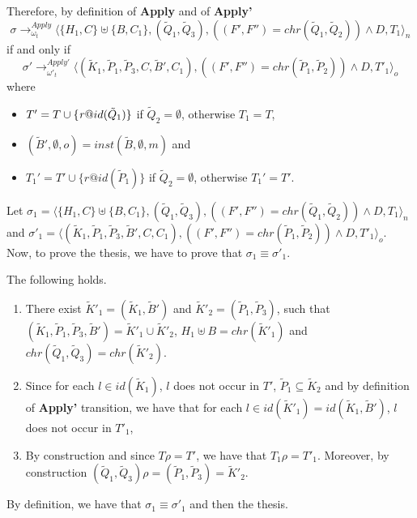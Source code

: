 \documentclass[final]{acmtrans2e}
\newcommand{\la}{\langle}
\newcommand{\ra}{\rangle}
\newcommand{\rrarrow}{\longrightarrow}
\begin{document}
\begin{description}
Therefore, by definition of {\bf Apply} and of {\bf Apply'}
\[\sigma \rrarrow^{Apply}_{\omega_t} \la \{H_1,C\}\uplus \{B, C_1 \},(\tilde Q_1, \tilde Q_3),
((F',  F'')=chr(\tilde Q_1, \tilde Q_2))\wedge D, T_1 \ra_n\]
if and only if
\[\sigma' \rightarrow^{Apply'}_{\omega'_t}  \la(\tilde K_1,\tilde P_1, \tilde P_3 ,C, \tilde B', C_1),
((F',  F'')=chr(\tilde P_1, \tilde P_2))\wedge D, T'_1 \ra_o\]
where
\begin{itemize}
  \item $T'=T \cup \{{\it r}@id (\tilde Q_1)\}$ if $\tilde Q_2=\emptyset$,
 otherwise $T_1=T$,
  \item $(\tilde B',\emptyset ,o )= inst(\tilde B,\emptyset ,m)$ and
  \item $T_1'=T'\cup \{r @id (\tilde P_1)\}$ if $\tilde Q_2=\emptyset$,
 otherwise $T_1'=T'$.
\end{itemize}

Let $\sigma_1= \la \{H_1,C\}\uplus \{B, C_1 \},(\tilde Q_1, \tilde Q_3),
((F',  F'')=chr(\tilde Q_1, \tilde Q_2))\wedge D, T_1 \ra_n$ and
$\sigma'_1= \la(\tilde K_1,\tilde P_1, \tilde P_3 , \tilde B',C, C_1),
((F',  F'')=chr(\tilde P_1, \tilde P_2))\wedge D, T'_1 \ra_o$. \\

Now, to prove the thesis, we have to prove that
$\sigma_1 \equiv \sigma'_1$.

The following holds.

\begin{enumerate}
\item  There exist $\tilde K'_1= (\tilde K_1, \tilde B') $ and $\tilde K'_2=(\tilde P_1, \tilde P_3)$, such that $(\tilde K_1,\tilde P_1, \tilde P_3 , \tilde B') =\tilde K'_1\cup \tilde K'_2$,
    $H_1 \uplus B = chr(\tilde K'_1)$ and $chr (\tilde Q_1,\tilde Q_3) = chr(\tilde K'_2)$.
\item Since for each $l \in id (\tilde K_1)$, $l$ does not occur in $T'$,
 $\tilde P_1 \subseteq \tilde K_2$ and by definition of \textbf{Apply'} transition, we have that for each $l \in id (\tilde K'_1)= id(\tilde K_1, \tilde B')$, $l$ does not occur in $T'_1$,
\item By construction and since $T\rho=T'$, we have that $T_1\rho=T'_1$.
Moreover, by construction  $(\tilde Q_1,\tilde Q_3) \rho= (\tilde P_1,\tilde P_3)= \tilde K'_2$.
\end{enumerate}
By definition, we have that $\sigma_1 \equiv \sigma'_1$ and then the thesis.
\end{description}
\noindent{$\Box$}
\end{document}
